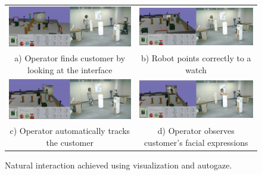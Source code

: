 \documentclass[journal]{IEEEtran}
\begin{document}
\begin{figure}[t]
\centering
\begin{tabular}{@{}cc@{}}
\includegraphics[width=\columnwidth]{figs/opATogether_1} &
\includegraphics[width=\columnwidth]{figs/opATogether_2}\\
a) Operator finds customer by looking at the interface &
b) Robot points correctly to a watch\\
\includegraphics[width=\columnwidth]{figs/opATogether_3} &
\includegraphics[width=\columnwidth]{figs/opATogether_4}\\
c) Operator automatically tracks the customer &
d) Operator observes customer's facial expressions
\end{tabular}
\caption{Natural interaction achieved using visualization and autogaze.}
\label{fig:opATogether}
\end{figure}
\end{document}
